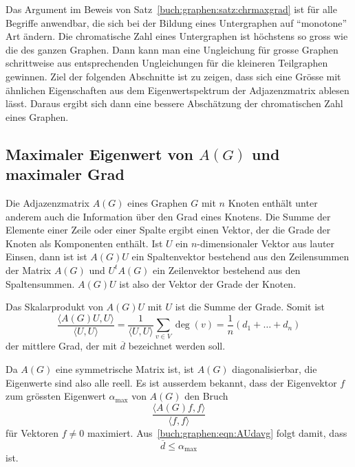 Das Argument im Beweis von Satz~\ref{buch:graphen:satz:chrmaxgrad}
ist für alle Begriffe anwendbar, die sich bei der Bildung eines 
Untergraphen auf ``monotone'' Art ändern.
Die chromatische Zahl eines Untergraphen ist höchstens so gross wie die
des ganzen Graphen. 
Dann kann man eine Ungleichung für grosse Graphen schrittweise aus
entsprechenden Ungleichungen für die kleineren Teilgraphen gewinnen.
Ziel der folgenden Abschnitte ist zu zeigen, dass sich eine Grösse
mit ähnlichen Eigenschaften aus dem Eigenwertspektrum der Adjazenzmatrix
ablesen lässt.
Daraus ergibt sich dann eine bessere Abschätzung der chromatischen Zahl
eines Graphen.

%
%
\subsection{Maximaler Eigenwert von $A(G)$ und maximaler Grad
\label{buch:subsection:maximaler-eigenwert}}
Die Adjazenzmatrix $A(G)$ eines Graphen $G$  mit $n$ Knoten enthält unter
anderem auch die Information über den Grad eines Knotens.
Die Summe der Elemente einer Zeile oder einer Spalte ergibt einen Vektor,
der die Grade der Knoten als Komponenten enthält.
Ist $U$ ein $n$-dimensionaler Vektor aus lauter Einsen, dann ist
ist $A(G)U$ ein Spaltenvektor bestehend aus den Zeilensummen der Matrix 
$A(G)$ und
$U^tA(G)$ ein Zeilenvektor bestehend aus den Spaltensummen.
$A(G)U$ ist also der Vektor der Grade der Knoten.

Das Skalarprodukt von $A(G)U$ mit $U$ ist die Summe der Grade.
Somit ist
\begin{equation}
\frac{\langle A(G)U,U\rangle}{\langle U,U\rangle}
=
\frac{1}{\langle U,U\rangle}\sum_{v\in V}\deg(v)
=
\frac{1}{n}(d_1+\dots+d_n)
\label{buch:graphen:eqn:AUdavg}
\end{equation}
der mittlere Grad, der mit $\overline{d}$ bezeichnet werden soll.

Da $A(G)$ eine symmetrische Matrix ist, ist $A(G)$ diagonalisierbar,
die Eigenwerte sind also alle reell.
Es ist ausserdem bekannt, dass der Eigenvektor $f$ zum grössten Eigenwert
$\alpha_{\text{max}}$ von $A(G)$
den Bruch
\[
\frac{\langle A(G)f,f\rangle}{\langle f,f\rangle}
\]
für Vektoren $f\ne 0$ maximiert.
Aus~\eqref{buch:graphen:eqn:AUdavg} folgt damit, dass
\begin{equation}
\overline{d}
\le
\alpha_{\text{max}}
\label{buch:graphen:eqn:dqueramax}
\end{equation}
ist.

